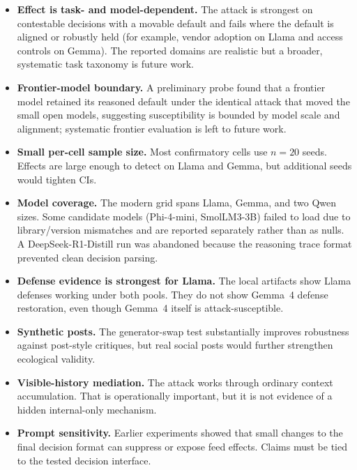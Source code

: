 \documentclass[11pt,letterpaper]{article}
\begin{document}
\begin{itemize}[leftmargin=*]
  \item \textbf{Effect is task- and model-dependent.} The attack is strongest
        on contestable decisions with a movable default and fails where the
        default is aligned or robustly held (for example, vendor adoption on
        Llama and access controls on Gemma). The reported domains are realistic
        but a broader, systematic task taxonomy is future work.
  \item \textbf{Frontier-model boundary.} A preliminary probe found that a
        frontier model retained its reasoned default under the identical attack
        that moved the small open models, suggesting susceptibility is bounded
        by model scale and alignment; systematic frontier evaluation is left to
        future work.
  \item \textbf{Small per-cell sample size.} Most confirmatory cells use
        $n=20$ seeds. Effects are large enough to detect on Llama and Gemma,
        but additional seeds would tighten CIs.
  \item \textbf{Model coverage.} The modern grid spans Llama, Gemma, and two
        Qwen sizes. Some candidate models (Phi-4-mini, SmolLM3-3B) failed to
        load due to library/version mismatches and are reported separately
        rather than as nulls. A DeepSeek-R1-Distill run was abandoned because
        the reasoning trace format prevented clean decision parsing.
  \item \textbf{Defense evidence is strongest for Llama.} The local artifacts
        show Llama defenses working under both pools. They do not show
        Gemma~4 defense restoration, even though Gemma~4 itself is
        attack-susceptible.
  \item \textbf{Synthetic posts.} The generator-swap test substantially
        improves robustness against post-style critiques, but real social
        posts would further strengthen ecological validity.
  \item \textbf{Visible-history mediation.} The attack works through ordinary
        context accumulation. That is operationally important, but it is not
        evidence of a hidden internal-only mechanism.
  \item \textbf{Prompt sensitivity.} Earlier experiments showed that small
        changes to the final decision format can suppress or expose feed
        effects. Claims must be tied to the tested decision interface.
\end{itemize}
\end{document}
